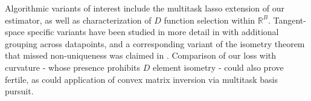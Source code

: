 Algorithmic variants of interest include the multitask lasso \citep{ Hastie2015-qa} extension of our estimator, as well as characterization of $D$ function selection within $\mathbb R^B$.
Tangent-space specific variants have been studied in more detail in \citet{Koelle2022-ju, Koelle2024-no} with additional grouping across datapoints, and a corresponding variant of the isometry theorem that missed non-uniqueness was claimed in \citet{Koelle2022-lp}.
Comparison of our loss with curvature - whose presence prohibits $D$ element isometry - could also prove fertile, as could application of convex matrix inversion via multitask basis pursuit.